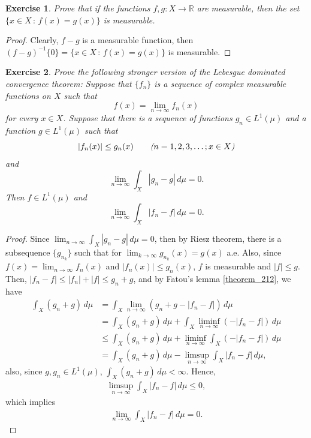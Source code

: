 \documentclass[11pt]{book}
\newtheorem{exercise}{Exercise}[section]
\theoremstyle{definition}
\numberwithin{equation}{chapter}
\begin{document}
\medskip

\begin{exercise}
Prove that if the functions $f,g:X\to \mathbb{R}$ are
measurable, then the set $\{x \in X \,:\, f(x)=g(x)\}$ is measurable.
\end{exercise}
\begin{proof}
Clearly, $f - g$ is a measurable function, then $(f - g)^{-1}\{0\} = \{x \in X \,:\, f(x)=g(x)\}$ is measurable.
\end{proof}

\medskip

\begin{exercise}
Prove the following stronger version of the
Lebesgue dominated convergence theorem: Suppose that $\{ f_n\}$ is a sequence of complex measurable functions on $X$ such that
$$
f(x)=\lim_{n\to\infty} f_n(x)
$$
for every $x\in X$. Suppose that there is a sequence of functions
$g_n\in L^1(\mu)$ and a function $g\in L^1(\mu)$ such that
$$
\left|f_n(x)\right|\leq g_n(x)
\qquad
\mbox{{\em (}$n=1,2,3,\dots; x\in X${\em )}}
$$
and
$$
\lim_{n\to\infty} \int_X|g_n-g|\, d\mu = 0.
$$
Then $f\in L^1(\mu)$ and
$$
\lim_{n\to\infty} \int_X|f_n-f|\, d\mu = 0.
$$
\end{exercise}
\begin{proof} 
Since $\lim_{n\to\infty} \int_X |g_n - g|\, d\mu = 0$, then by Riesz theorem, there is a subsequence $\{g_{n_k}\}$ such that for $\lim_{k\to\infty} g_{n_k}(x) = g(x)$ a.e. Also, since $f(x) = \lim_{n\to\infty} f_n(x)$ and $\left|f_n(x)\right|\leq g_n(x)$, $f$ is measurable and $\left|f\right| \leq g$. Then, $\left|f_n - f\right| \leq \left|f_n\right| + \left|f\right| \leq g_n + g$, and by Fatou's lemma \ref{theorem_212}, we have
\begin{align*}
    \int_X (g_n + g)\, d\mu & = \int_X \lim_{n\to\infty} (g_n + g - \left|f_n - f\right|)\, d\mu \\
    & = \int_X (g_n + g)\, d\mu + \int_X \liminf_{n\to\infty} (-\left|f_n - f\right|)\, d\mu \\
    & \leq \int_X (g_n + g)\, d\mu + \liminf_{n\to\infty} \int_X (-\left|f_n - f\right|)\, d\mu \\
    & = \int_X (g_n + g)\, d\mu - \limsup_{n\to\infty} \int_X \left|f_n - f\right|\, d\mu,
\end{align*}
also, since $g, g_n \in L^1(\mu)$, $\int_X (g_n + g)\, d\mu < \infty$. Hence,
\begin{align*}
    \limsup_{n\to\infty} \int_X \left|f_n - f\right|\, d\mu \leq 0,
\end{align*}
which implies
\begin{align*}
    \lim_{n\to\infty} \int_X \left|f_n - f\right|\, d\mu = 0.
\end{align*}
\end{proof}
\end{document}
